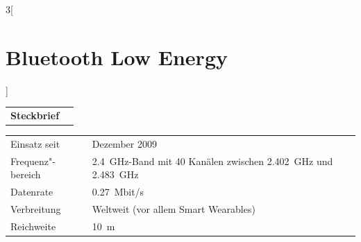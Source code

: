 \begin{multicols}{3}[\section{Bluetooth Low Energy}]


\newrefsegment

\begin{tabular}{p{}p{2.7 cm}}
\textbf{Steckbrief}& \\
\end{tabular}
\begin{tabular}{p{}p{2.7 cm}}
      Einsatz seit & Dezember 2009\\
      Frequenz"-bereich  & \SI{2,4}{\giga\hertz}-Band mit 40 Kanälen zwischen \SI{2,402}{\giga\hertz} und \SI{2,483}{\giga\hertz}\\
      Datenrate & \SI{0,27}{Mbit/s}\\
      Verbreitung & Weltweit (vor allem Smart Wearables)\\
      Reichweite & \SI{10}{\metre}\\
\end{tabular}

\par

\end{multicols}
